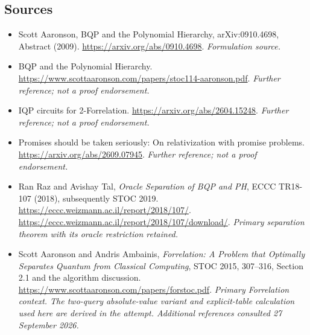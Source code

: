 \documentclass[11pt]{article}
\begin{document}
\subsection{Sources}
\begin{itemize}
\item[S1]Scott Aaronson, BQP and the Polynomial Hierarchy, arXiv:0910.4698, Abstract (2009).
\url{https://arxiv.org/abs/0910.4698}.
\textit{Formulation source.}
\item[S2]BQP and the Polynomial Hierarchy.
\url{https://www.scottaaronson.com/papers/stoc114-aaronson.pdf}.
\textit{Further reference; not a proof endorsement.}
\item[S3]IQP circuits for 2-Forrelation.
\url{https://arxiv.org/abs/2604.15248}.
\textit{Further reference; not a proof endorsement.}
\item[S4]Promises should be taken seriously: On relativization with promise problems.
\url{https://arxiv.org/abs/2609.07945}.
\textit{Further reference; not a proof endorsement.}
\item[E1]Ran Raz and Avishay Tal, \emph{Oracle Separation of BQP and PH},
ECCC TR18-107 (2018), subsequently STOC 2019.
\url{https://eccc.weizmann.ac.il/report/2018/107/}.
\url{https://eccc.weizmann.ac.il/report/2018/107/download/}.
\textit{Primary separation theorem with its oracle restriction retained.}
\item[E2]Scott Aaronson and Andris Ambainis,
\emph{Forrelation: A Problem that Optimally Separates Quantum from Classical
Computing}, STOC 2015, 307--316, Section 2.1 and the algorithm discussion.
\url{https://www.scottaaronson.com/papers/forstoc.pdf}.
\textit{Primary Forrelation context. The two-query absolute-value variant
and explicit-table calculation used here are derived in the attempt.
Additional references consulted 27 September 2026.}
\end{itemize}
\end{document}

